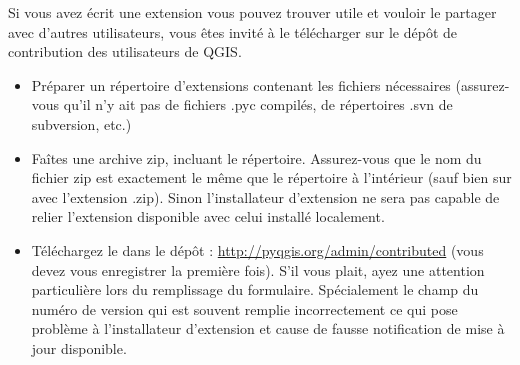 Si vous avez écrit une extension vous pouvez trouver utile et vouloir le partager
avec d'autres utilisateurs, vous êtes invité à le télécharger sur le dépôt de
contribution des utilisateurs de QGIS.
\begin{itemize}
\item Préparer un répertoire d'extensions contenant les fichiers nécessaires
(assurez-vous qu'il n'y ait pas de fichiers .pyc compilés, de répertoires .svn
de subversion, etc.)
\item Faîtes une archive zip, incluant le répertoire. Assurez-vous que le nom du
fichier zip est exactement le même que le répertoire à l'intérieur (sauf bien
sur avec l'extension .zip). Sinon l'installateur d'extension ne sera pas capable
de relier l'extension disponible avec celui installé localement.
\item Téléchargez le dans le dépôt : \url{http://pyqgis.org/admin/contributed}
(vous devez vous enregistrer la première fois). S'il vous plait, ayez une
attention particulière lors du remplissage du formulaire. Spécialement le champ
du numéro de version qui est souvent remplie incorrectement ce qui pose
problème à l'installateur d'extension et cause de fausse notification de mise à
jour disponible.
\end{itemize}

